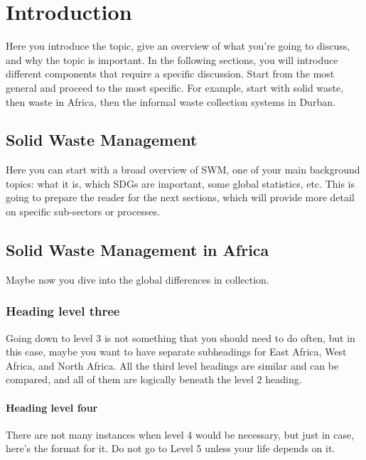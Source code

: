 \cleardoublepage%
\chapter{\label{chap:intro}Introduction}%

Here you introduce the topic, give an overview of what you’re going to discuss, and why the topic is important.  In the following sections, you will introduce different components that require a specific discussion.  Start from the most general and proceed to the most specific.  For example, start with solid waste, then waste in Africa, then the informal waste collection systems in Durban.

\section{\label{sec:intro_swm}Solid Waste Management}%

Here you can start with a broad overview of SWM, one of your main background topics:  what it is, which SDGs are important, some global statistics, etc.  This is going to prepare the reader for the next sections, which will provide more detail on specific sub-sectors or processes.

\section{\label{sec:intro_swm_africa}Solid Waste Management in Africa}%

Maybe now you dive into the global differences in collection.

\subsection{\label{sec:intro_level3}Heading level three}

Going down to level 3 is not something that you should need to do often, but in this case, maybe you want to have separate subheadings for East Africa, West Africa, and North Africa.  All the third level headings are similar and can be compared, and all of them are logically beneath the level 2 heading. 

\subsubsection{\label{sec:intro_level4}Heading level four}

There are not many instances when level 4 would be necessary, but just in case, here’s the format for it. Do not go to Level 5 unless your life depends on it.


